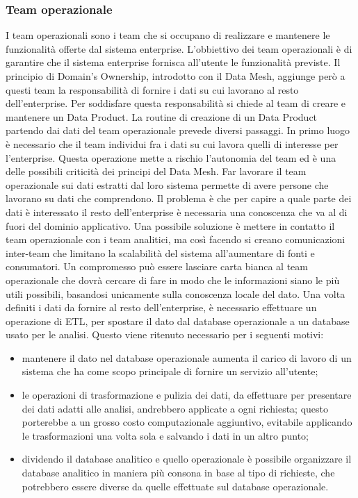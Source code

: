 \documentclass[a4paper,12pt]{report}
\begin{document}
\subsubsection{Team operazionale}
I team operazionali sono i team che si occupano di realizzare e mantenere le funzionalità offerte dal sistema enterprise.
L'obbiettivo dei team operazionali è di garantire che il sistema enterprise fornisca all'utente le funzionalità previste. 
Il principio di Domain's Ownership, introdotto con il Data Mesh, aggiunge però a questi team la responsabilità di fornire i dati su cui lavorano al resto dell'enterprise.
Per soddisfare questa responsabilità si chiede al team di creare e mantenere un Data Product.
La routine di creazione di un Data Product partendo dai dati del team operazionale prevede diversi passaggi.
In primo luogo è necessario che il team individui fra i dati su cui lavora quelli di interesse per l'enterprise.
Questa operazione mette a rischio l'autonomia del team ed è una delle possibili criticità dei principi del Data Mesh. 
Far lavorare il team operazionale sui dati estratti dal loro sistema permette di avere persone che lavorano su dati che comprendono. 
Il problema è che per capire a quale parte dei dati è interessato il resto dell'enterprise è necessaria una conoscenza che va al di fuori del dominio applicativo. 
Una possibile soluzione è mettere in contatto il team operazionale con i team analitici, ma così facendo si creano comunicazioni inter-team che limitano la scalabilità del sistema all'aumentare di fonti e consumatori.
Un compromesso può essere lasciare carta bianca al team operazionale che dovrà cercare di fare in modo che le informazioni siano le più utili possibili, basandosi unicamente sulla conoscenza locale del dato.
Una volta definiti i dati da fornire al resto dell'enterprise, è necessario effettuare un operazione di ETL, per spostare il dato dal database operazionale a un database usato per le analisi. 
Questo viene ritenuto necessario per i seguenti motivi:
\begin{itemize}
    \item mantenere il dato nel database operazionale aumenta il carico di lavoro di un sistema che ha come scopo principale di fornire un servizio all'utente;
    \item le operazioni di trasformazione e pulizia dei dati, da effettuare per presentare dei dati adatti alle analisi, andrebbero applicate a ogni richiesta; 
    questo porterebbe a un grosso costo computazionale aggiuntivo, evitabile applicando le trasformazioni una volta sola e salvando i dati in un altro punto;
    \item dividendo il database analitico e quello operazionale è possibile organizzare il database analitico in maniera più consona in base al tipo di richieste, che potrebbero essere diverse da quelle effettuate sul database operazionale.
\end{itemize}
\end{document}
